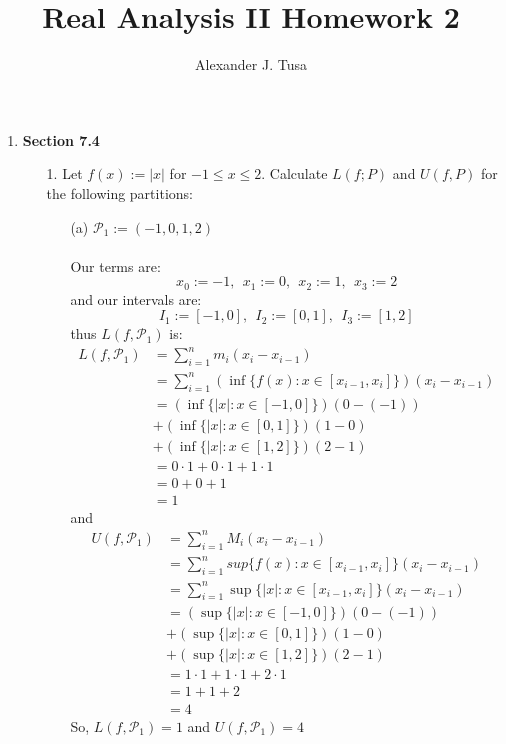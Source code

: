\documentclass[12pt,letterpaper]{article}
\author{Alexander J. Tusa}
\title{Real Analysis II Homework 2}
\theoremstyle{case}
\theoremstyle{definition}
\begin{document}
	\maketitle
	\begin{enumerate}
		\item \textbf{Section 7.4}
		\begin{enumerate}
			\item[1.] Let $f(x):=|x|$ for $-1 \leq x \leq 2$. Calculate $L(f;P)$ and $U(f,P)$ for the following partitions:
			\begin{enumerate}
				\item[(a)] $\mathcal{P}_1 :=(-1,0,1,2)$
				\\\\Our terms are:
				\[x_0:= -1,\ \ x_1:=0,\ \ x_2:=1,\ \ x_3:=2\]
				and our intervals are:
				\[I_1:=[-1,0],\ \ I_2:=[0,1],\ \ I_3:=[1,2]\]
				thus $L(f,\mathcal{P}_1)$ is:
				\begin{align*}
					L(f,\mathcal{P}_1) &= \sum_{i=1}^{n} m_i(x_i-x_{i-1}) \\
					&= \sum_{i=1}^{n} \left(\inf\{f(x):x \in [x_{i-1},x_i]\}\right) (x_i-x_{i-1}) \\
					&= (\inf \{|x|:x \in [-1,0]\})(0-(-1))\\ 
					&+ (\inf \{|x|: x \in [0,1]\})(1-0)\\
					&+(\inf \{|x|: x\in [1,2]\})(2-1) \\
					&= 0 \cdot 1 + 0 \cdot 1 + 1 \cdot 1 \\
					&= 0+0+1 \\
					&= 1
				\end{align*}
				and
				\begin{align*}
					U(f,\mathcal{P}_1) &= \sum_{i=1}^{n} M_i (x_i-x_{i-1}) \\
					&= \sum_{i=1}^{n} sup \{f(x): x \in [x_{i-1},x_i]\} (x_i-x_{i-1}) \\
					&= \sum_{i=1}^{n} \sup \{|x|: x \in [x_{i-1},x_i]\} (x_i-x_{i-1}) \\
					&= (\sup \{|x|:x \in [-1,0]\})(0-(-1)) \\
					&+ (\sup \{|x| : x \in [0,1]\})(1-0) \\
					&+ (\sup \{|x|: x \in [1,2]\})(2-1) \\
					&= 1 \cdot 1 + 1 \cdot 1 + 2 \cdot 1 \\
					&= 1 + 1 +2 \\
					&= 4
				\end{align*}
				So, $L(f,\mathcal{P}_1)=1$ and $U(f,\mathcal{P}_1)=4$\\

\end{enumerate}
\end{enumerate}
\end{enumerate}
\end{document}
